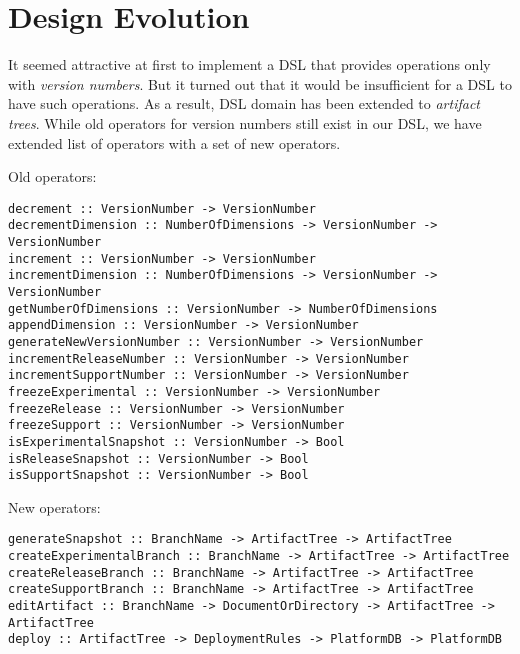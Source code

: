 \documentclass[11pt]{article}
\begin{document}


\section{Design Evolution}
\label{sec:evol}
It seemed attractive at first to implement a DSL that provides operations only with \textit{version numbers}. But it turned out that it would be insufficient for a DSL to have such operations. As a result, DSL domain has been extended to \textit{artifact trees}. While old operators for version numbers still exist in our DSL, we have extended list of operators with a set of new operators. 

Old operators:
\begin{lstlisting}[style=Haskell]
decrement :: VersionNumber -> VersionNumber
decrementDimension :: NumberOfDimensions -> VersionNumber -> VersionNumber
increment :: VersionNumber -> VersionNumber
incrementDimension :: NumberOfDimensions -> VersionNumber -> VersionNumber
getNumberOfDimensions :: VersionNumber -> NumberOfDimensions
appendDimension :: VersionNumber -> VersionNumber
generateNewVersionNumber :: VersionNumber -> VersionNumber
incrementReleaseNumber :: VersionNumber -> VersionNumber
incrementSupportNumber :: VersionNumber -> VersionNumber
freezeExperimental :: VersionNumber -> VersionNumber
freezeRelease :: VersionNumber -> VersionNumber
freezeSupport :: VersionNumber -> VersionNumber
isExperimentalSnapshot :: VersionNumber -> Bool
isReleaseSnapshot :: VersionNumber -> Bool
isSupportSnapshot :: VersionNumber -> Bool
\end{lstlisting}

New operators:
\begin{lstlisting}[style=Haskell]
generateSnapshot :: BranchName -> ArtifactTree -> ArtifactTree
createExperimentalBranch :: BranchName -> ArtifactTree -> ArtifactTree
createReleaseBranch :: BranchName -> ArtifactTree -> ArtifactTree
createSupportBranch :: BranchName -> ArtifactTree -> ArtifactTree
editArtifact :: BranchName -> DocumentOrDirectory -> ArtifactTree -> ArtifactTree
deploy :: ArtifactTree -> DeploymentRules -> PlatformDB -> PlatformDB
\end{lstlisting}
\end{document}

